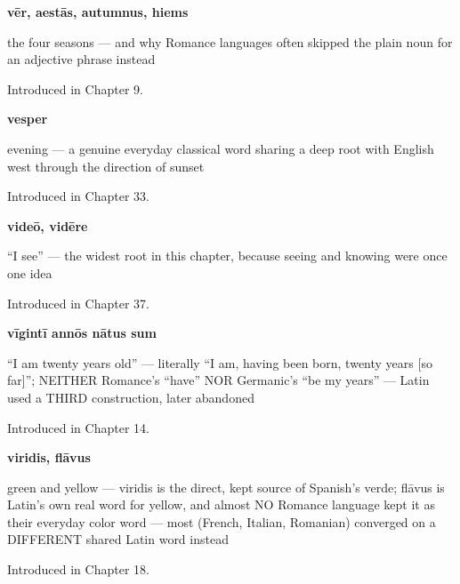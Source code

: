 \noindent\begin{minipage}[t]{\linewidth}
\raggedright
\textbf{vēr, aestās, autumnus, hiems}\par
\small the four seasons — and why Romance languages often skipped the plain noun for an adjective phrase instead\par
\footnotesize Introduced in Chapter 9.
\end{minipage}\par\medskip

\noindent\begin{minipage}[t]{\linewidth}
\raggedright
\textbf{vesper}\par
\small evening — a genuine everyday classical word sharing a deep root with English west through the direction of sunset\par
\footnotesize Introduced in Chapter 33.
\end{minipage}\par\medskip

\noindent\begin{minipage}[t]{\linewidth}
\raggedright
\textbf{videō, vidēre}\par
\small \textquotedblleft{}I see\textquotedblright{} — the widest root in this chapter, because seeing and knowing were once one idea\par
\footnotesize Introduced in Chapter 37.
\end{minipage}\par\medskip

\noindent\begin{minipage}[t]{\linewidth}
\raggedright
\textbf{vīgintī annōs nātus sum}\par
\small \textquotedblleft{}I am twenty years old\textquotedblright{} — literally \textquotedblleft{}I am, having been born, twenty years {[}so far{]}\textquotedblright{}; NEITHER Romance's \textquotedblleft{}have\textquotedblright{} NOR Germanic's \textquotedblleft{}be my years\textquotedblright{} — Latin used a THIRD construction, later abandoned\par
\footnotesize Introduced in Chapter 14.
\end{minipage}\par\medskip

\noindent\begin{minipage}[t]{\linewidth}
\raggedright
\textbf{viridis, flāvus}\par
\small green and yellow — viridis is the direct, kept source of Spanish's verde; flāvus is Latin's own real word for yellow, and almost NO Romance language kept it as their everyday color word — most (French, Italian, Romanian) converged on a DIFFERENT shared Latin word instead\par
\footnotesize Introduced in Chapter 18.
\end{minipage}\par\medskip

